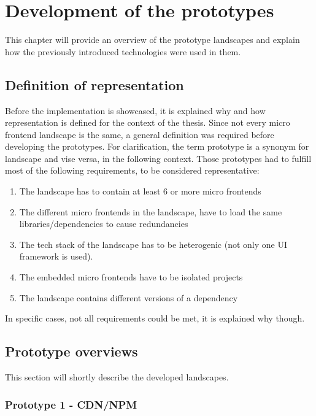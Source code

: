 \chapter{Development of the prototypes} %
\label{Chapter6}


This chapter will provide an overview of the prototype landscapes and explain how the previously introduced technologies were used in them.

\section{Definition of representation}

Before the implementation is showcased, it is explained why and how representation is defined for the context of the thesis.
Since not every micro frontend landscape is the same, a general definition was required before developing the prototypes.
For clarification, the term prototype is a synonym for landscape and vise versa, in the following context.
Those prototypes had to fulfill most of the following requirements, to be considered representative:

\begin{enumerate}
	\item The landscape has to contain at least 6 or more micro frontends
	\item The different micro frontends in the landscape, have to load the same libraries/dependencies to cause redundancies
	\item The tech stack of the landscape has to be heterogenic (not only one UI framework is used).
	\item The embedded micro frontends have to be isolated projects
	\item The landscape contains different versions of a dependency
\end{enumerate}

In specific cases, not all requirements could be met, it is explained why though.

\section{Prototype overviews}

This section will shortly describe the developed landscapes.

\subsection{Prototype 1 - CDN/NPM}

